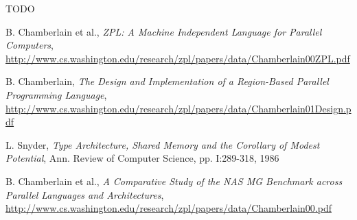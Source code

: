 \begin{frame}
  TODO

  \begin{thebibliography}{10}
    \beamertemplatearticlebibitems

    B. Chamberlain et al., {\em ZPL: A Machine Independent Language
      for Parallel Computers},
    \url{http://www.cs.washington.edu/research/zpl/papers/data/Chamberlain00ZPL.pdf}
    
    B. Chamberlain, {\em The Design and Implementation of a
      Region-Based Parallel Programming Language},
    \url{http://www.cs.washington.edu/research/zpl/papers/data/Chamberlain01Design.pdf}

    L. Snyder, {\em Type Architecture, Shared Memory and the Corollary
      of Modest Potential}, Ann. Review of Computer Science,
    pp. I:289-318, 1986

    B. Chamberlain et al., {\em A Comparative Study of the NAS MG
      Benchmark across Parallel Languages and Architectures},
    \url{http://www.cs.washington.edu/research/zpl/papers/data/Chamberlain00.pdf}
  \end{thebibliography}
\end{frame}



